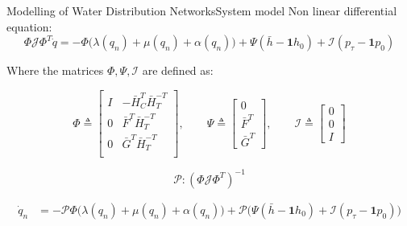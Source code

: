 \begin{frame}{Modelling of Water Distribution Networks}{System model}
	Non linear differential equation:
	\begin{equation}
		\Phi\mathcal{J}\Phi^T \dot{q} = -\Phi\Big(\lambda(q_n)+\mu(q_n)+\alpha(q_n)\Big) + \Psi(\bar{h}-\mathbf{1}h_0) + \mathcal{I}(p_{\tau}-\mathbf{1}p_0)
	\end{equation}

	Where the matrices $\Phi, \Psi, \mathcal{I}$ are defined as:
	
	\begin{equation}
		\Phi \triangleq 
		\begin{bmatrix} 
			I & -\bar{H}_C^T\bar{H}_T^{-T} \\ 0 & \bar{F}^T\bar{H}_T^{-T} \\ 0  & \bar{G}^T\bar{H}_T^{-T} \\ 
		\end{bmatrix}
		, \qquad
		\Psi \triangleq
		\begin{bmatrix}
			0 \\ \bar{F}^T \\ \bar{G}^T
		\end{bmatrix}
		, \qquad
		\mathcal{I} \triangleq
		\begin{bmatrix}
			0 \\ 0 \\ I
		\end{bmatrix}
	\end{equation}

	\begin{equation}
		\mathcal{P}: (\Phi \mathcal{J} \Phi^T)^{-1}
	\end{equation}
	
	
	
	\begin{equation}\label{eq:NonLinearModelSimplified}
		\begin{split}
			\dot{q}_n &=  -\mathcal{P}\Phi\Big(\lambda(q_n)+\mu(q_n)+\alpha(q_n)\Big) + \mathcal{P}\Big(\Psi(\bar{h}-\mathbf{1}h_0) + \mathcal{I}(p_{\tau}-\mathbf{1}p_0)\Big) 
		\end{split}	
	\end{equation}


\end{frame}


